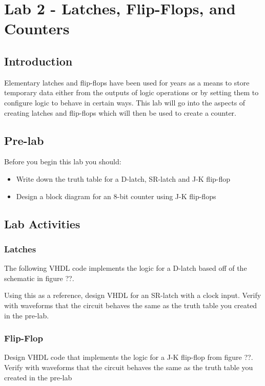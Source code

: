 \section{Lab 2 - Latches, Flip-Flops, and Counters}

\subsection{Introduction}
Elementary latches and flip-flops have been used for years as a means to store temporary data either from the outputs of logic operations or by setting them to configure logic to behave in certain ways. This lab will go into the aspects of creating latches and flip-flops which will then be used to create a counter. 

\subsection{Pre-lab}
Before you begin this lab you should:

\begin{itemize}
	\item Write down the truth table for a D-latch, SR-latch and J-K flip-flop
	\item Design a block diagram for an 8-bit counter using J-K flip-flops
\end{itemize} 

\subsection{Lab Activities}

\subsubsection{Latches}
The following VHDL code implements the logic for a D-latch based off of the schematic in figure ??. 


Using this as a reference, design VHDL for an SR-latch with a clock input. Verify with waveforms that the circuit behaves the same as the truth table you created in the pre-lab.


\subsubsection{Flip-Flop}
Design VHDL code that implements the logic for a J-K flip-flop from figure ??. Verify with waveforms that the circuit behaves the same as the truth table you created in the pre-lab 

